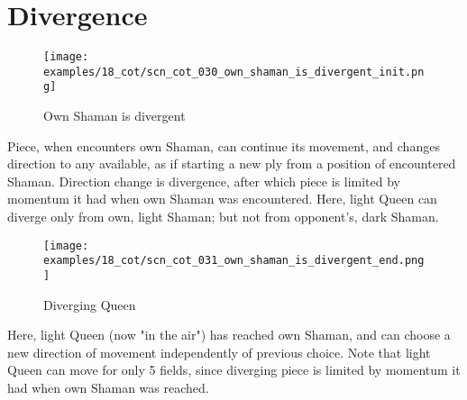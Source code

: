 \clearpage %

\section*{Divergence}
\label{sec:Conquest of Tlalocan/Divergence}

\vspace*{-1.4\baselineskip}
\noindent
\begin{figure}[!h]
\texttt{[image: examples/18\_cot/scn\_cot\_030\_own\_shaman\_is\_divergent\_init.png]}
\vspace*{-1.3\baselineskip}
\caption{Own Shaman is divergent}
\label{fig:scn_cot_030_own_shaman_is_divergent_init}
\end{figure}

\vspace*{-0.5\baselineskip}
Piece, when encounters own Shaman, can continue its movement, and changes direction
to any available, as if starting a new ply from a position of encountered Shaman.
Direction change is divergence, after which piece is limited by momentum it had when
own Shaman was encountered. \newline
\indent
Here, light Queen can diverge only from own, light Shaman; but not from opponent's,
dark Shaman.

\clearpage %

\vspace*{-2.1\baselineskip}
\noindent
\begin{figure}[!h]
\texttt{[image: examples/18\_cot/scn\_cot\_031\_own\_shaman\_is\_divergent\_end.png]}
\vspace*{-1.3\baselineskip}
\caption{Diverging Queen}
\label{fig:scn_cot_031_own_shaman_is_divergent_end}
\end{figure}

\vspace*{-0.4\baselineskip}
Here, light Queen (now "in the air") has reached own Shaman, and can choose a new
direction of movement independently of previous choice. Note that light Queen can
move for only 5 fields, since diverging piece is limited by momentum it had when
own Shaman was reached.

